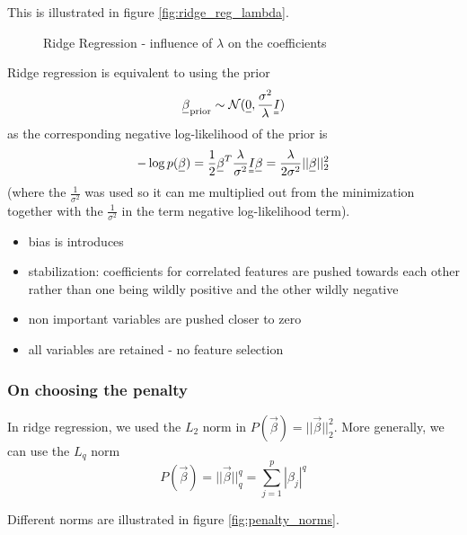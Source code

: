 This is illustrated in figure \ref{fig:ridge_reg_lambda}.

\begin{figure}[!htb]
    \centering
    
    \caption{Ridge Regression - influence of $\lambda$ on the coefficients}
    \label{fig:ridge_reg_lamda}
\end{figure}

Ridge regression is equivalent to using the prior
\begin{equation}
    \vec{\beta}_\text{prior} \sim \mathcal{N}(\vec{0}, \frac{\sigma^2}{\lambda} \mat{I})
\end{equation}
as the corresponding negative log-likelihood of the prior is
\begin{equation}
    -\log p(\vec{\beta}) = \frac{1}{2} \vec{\beta}^T \frac{\lambda}{\sigma^2} \mat{I} \vec{\beta} = \frac{\lambda}{2 \sigma^2} || \vec{\beta} ||_2^2
\end{equation}
(where the $\frac{1}{\sigma^2}$ was used so it can me multiplied out from the minimization
together with the $\frac{1}{\sigma^2}$ in the term negative log-likelihood term).

\begin{itemize}
    \item bias is introduces
    \item \textcolor{green1}{stabilization:} coefficients for correlated features are pushed towards each other rather than
    one being wildly positive and the other wildly negative
    \item \textcolor{green1}{non important variables are pushed closer to zero}
    \item \textcolor{red1}{all variables are retained - no feature selection}
\end{itemize}

\subsubsection{On choosing the penalty}
In ridge regression, we used the $L_2$ norm in $P(\vec{\beta}) = || \vec{\beta} ||_2^2$.
More generally, we can use the $L_q$ norm
\begin{equation}
    P(\vec{\beta}) = || \vec{\beta} ||_q^q = \sum_{j=1}^p |\beta_j|^q
\end{equation}

Different norms are illustrated in figure \ref{fig:penalty_norms}.

